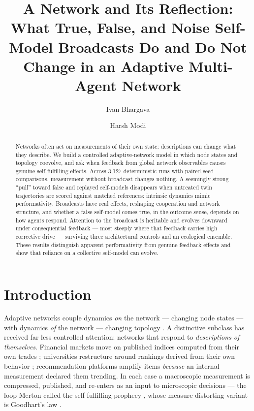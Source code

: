 \documentclass{svproc}
\begin{document}
\mainmatter
\title{A Network and Its Reflection: What True, False, and Noise Self-Model Broadcasts Do and Do Not Change in an Adaptive Multi-Agent Network}
\author{Ivan Bhargava \and Harsh Modi}

\maketitle

\begin{abstract}
Networks often act on measurements of their own state: descriptions can change what they describe. We build a controlled adaptive-network model in which node states and topology coevolve, and ask when feedback from global network observables causes genuine self-fulfilling effects. Across 3{,}127 deterministic runs with paired-seed comparisons, measurement without broadcast changes nothing. A seemingly strong ``pull'' toward false and replayed self-models disappears when untreated twin trajectories are scored against matched references: intrinsic dynamics mimic performativity. Broadcasts have real effects, reshaping cooperation and network structure, and whether a false self-model comes true, in the outcome sense, depends on how agents respond. Attention to the broadcast is heritable and evolves downward under consequential feedback --- most steeply where that feedback carries high corrective drive --- surviving three architectural controls and an ecological ensemble. These results distinguish apparent performativity from genuine feedback effects and show that reliance on a collective self-model can evolve.
\end{abstract}

\section{Introduction}
Adaptive networks couple dynamics \emph{on} the network --- changing node
states --- with dynamics \emph{of} the network --- changing topology
\cite{gross2008adaptive,holme2012temporal}. A distinctive subclass has received
far less controlled attention: networks that respond to \emph{descriptions of
themselves}. Financial markets move on published indices computed from their
own trades \cite{soros2013fallibility}; universities restructure around
rankings derived from their own behavior \cite{espeland2007rankings};
recommendation platforms amplify items \emph{because} an internal measurement
declared them trending. In each case a macroscopic measurement is
compressed, published, and re-enters as an input to microscopic decisions ---
the loop Merton called the self-fulfilling prophecy \cite{merton1948self},
whose measure-distorting variant is Goodhart's law
\cite{strathern1997improving}.
\end{document}
